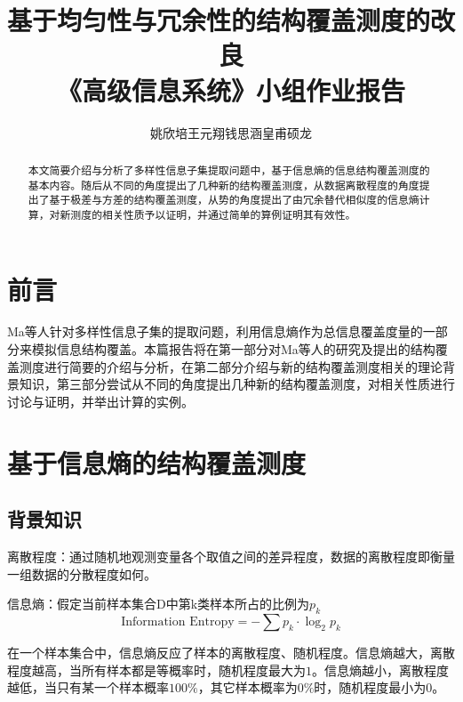 \documentclass{../notes}
\title{基于均匀性与冗余性的结构覆盖测度的改良 \\ {\Large 《高级信息系统》小组作业报告}}
\author{姚欣培\;王元翔\;钱思涵\;皇甫硕龙}
\begin{document}
    \maketitle
    \begin{abstract}
        本文简要介绍与分析了多样性信息子集提取问题中，基于信息熵的信息结构覆盖测度的基本内容。随后从不同的角度提出了几种新的结构覆盖测度，从数据离散程度的角度提出了基于极差与方差的结构覆盖测度，从势的角度提出了由冗余替代相似度的信息熵计算，对新测度的相关性质予以证明，并通过简单的算例证明其有效性。
    \end{abstract}

    \section*{前言}

    Ma等人\cite{ma2017content}针对多样性信息子集的提取问题，利用信息熵作为总信息覆盖度量的一部分来模拟信息结构覆盖。本篇报告将在第一部分对Ma等人的研究及提出的结构覆盖测度进行简要的介绍与分析，在第二部分介绍与新的结构覆盖测度相关的理论背景知识，第三部分尝试从不同的角度提出几种新的结构覆盖测度，对相关性质进行讨论与证明，并举出计算的实例。

    \section{基于信息熵的结构覆盖测度}

    \subsection*{背景知识}

    \begin{definition}
        离散程度：通过随机地观测变量各个取值之间的差异程度，数据的离散程度即衡量一组数据的分散程度如何。
    \end{definition}

    \begin{definition}
        信息熵：假定当前样本集合D中第k类样本所占的比例为$p_k$
        \begin{equation}
            \text{Information\ Entropy}=-\sum{p_k\cdot\log_2{p_k}}
        \end{equation}

        在一个样本集合中，信息熵反应了样本的离散程度、随机程度。信息熵越大，离散程度越高，当所有样本都是等概率时，随机程度最大为$1$。信息熵越小，离散程度越低，当只有某一个样本概率$100\%$，其它样本概率为$0\%$时，随机程度最小为$0$。
    \end{definition}
\end{document}
